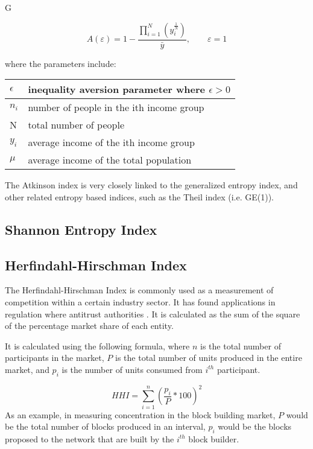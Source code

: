 G\documentclass[conference]{IEEEtran}
\begin{document}
\[A\left( \varepsilon \right)=1-\frac{\prod_{i=1}^{N}\left( y_{i}^{\frac{1}{N}} \right)}{\bar{y}}, \quad \quad \varepsilon=1\]

where the parameters include:

\begin{center}
\begin{tabular}{|l|l|}
\hline
$\epsilon$ & inequality aversion parameter where $\epsilon>0$ \\ \hline
$n_{i}$ & number of people in the ith income group \\ \hline
N & total number of people \\ \hline
$y_{i}$ & average income of the ith income group \\ \hline
$\mu$ & average income of the total population \\ \hline
\end{tabular}
\end{center}

The Atkinson index is very closely linked to the generalized entropy index, and other related entropy based indices, such as the Theil index (i.e. GE(1)).

\subsection{Shannon Entropy Index}

\subsection{Herfindahl-Hirschman Index}

The Herfindahl-Hirschman Index is commonly used as a measurement of competition within a certain industry sector. It has found applications in regulation where antitrust authorities \cite{usdoj2015}. It is calculated as the sum of the square of the percentage market share of each entity.

It is calculated using the following formula, where $n$ is the total number of participants in the market, $P$ is the total number of units produced in the entire market, and $p_i$ is the number of units consumed from $i^{th}$ participant.

\[HHI = \sum_{i=1}^{n} (\frac{p_{i}}{P}*100)^{2}
\]
As an example, in measuring concentration in the block building market, $P$ would be the total number of blocks produced in an interval,  $p_i$ would be the blocks proposed to the network that are built by the $i^{th}$ block builder.
\end{document}
